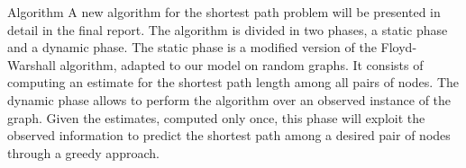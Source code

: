 \begin{projsection}{Algorithm}
	A new algorithm for the shortest path problem will be presented in detail in the final report.
	The algorithm is divided in two phases, a static phase and a dynamic phase.
	The static phase is a modified version of the Floyd-Warshall algorithm, adapted to our model on random graphs.
	It consists of computing an estimate for the shortest path length among all pairs of nodes.
	The dynamic phase allows to perform the algorithm over an observed instance of the graph.
	Given the estimates, computed only once, this phase will exploit the observed information to predict the shortest path among a desired pair of nodes through a greedy approach.
\end{projsection}